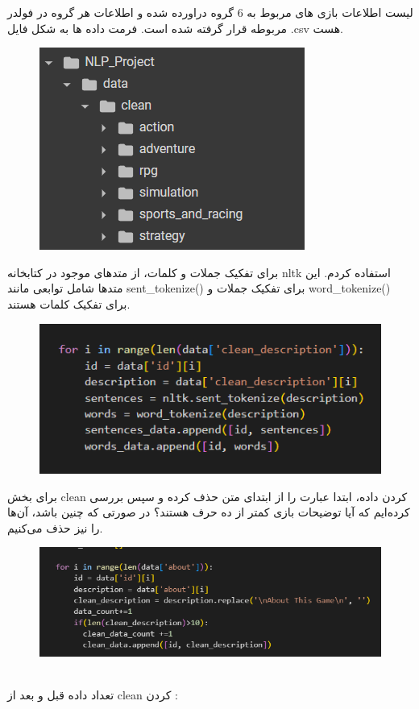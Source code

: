لیست اطلاعات بازی های مربوط به 6 گروه دراورده شده و اطلاعات هر گروه در فولدر مربوطه قرار گرفته شده است.
فرمت داده ها به شکل فایل .csv  هست.
\begin{figure}[H]
    \centering
    \includegraphics[width=0.4\linewidth]{./images/files.png}
   \end{figure}
   
برای تفکیک جملات و کلمات، از متدهای موجود در کتابخانه nltk استفاده کردم. این متدها شامل توابعی مانند sent\_tokenize() برای تفکیک جملات و word\_tokenize() برای تفکیک کلمات هستند.
\begin{figure}[H]
    \centering
    \includegraphics[width=0.7\linewidth]{./images/e_code1.png}
   \end{figure}
   
\newpage

برای  بخش clean کردن داده،  ابتدا عبارت  را از ابتدای متن حذف کرده و سپس بررسی کرده‌ایم که آیا توضیحات بازی کمتر از ده حرف هستند؟ در صورتی که چنین باشد، آن‌ها را نیز حذف می‌کنیم.

\begin{figure}[H]
    \centering
    \includegraphics[width=0.7\linewidth]{./images/e_code2.png}
   \end{figure}

\\
تعداد داده قبل و بعد از clean  کردن :

